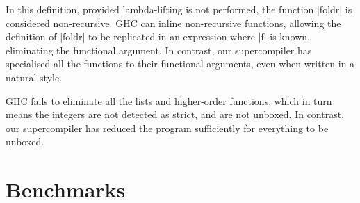 \documentclass[draft]{sigplanconf}
\begin{document}
In this definition, provided lambda-lifting is not performed, the function |foldr| is considered non-recursive. GHC can inline non-recursive functions, allowing the definition of |foldr| to be replicated in an expression where |f| is known, eliminating the functional argument. In contrast, our supercompiler has specialised all the functions to their functional arguments, even when written in a natural style.

GHC fails to eliminate all the lists and higher-order functions, which in turn means the integers are not detected as strict, and are not unboxed. In contrast, our supercompiler has reduced the program sufficiently for everything to be unboxed.

\section{Benchmarks}
\label{sec:benchmarks}
\end{document}

